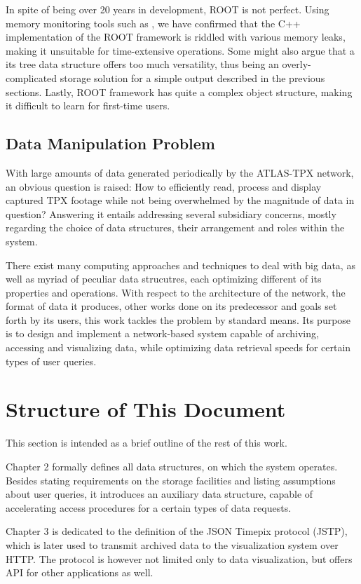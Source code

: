In spite of being over 20 years in development, ROOT is not perfect. Using memory monitoring tools such as \cite{nethercote2007valgrind}, we have confirmed that the C++ implementation of the ROOT framework is riddled with various memory leaks, making it unsuitable for time-extensive operations. Some might also argue that a its tree data structure offers too much versatility, thus being an overly-complicated storage solution for a simple output described in the previous sections. Lastly, ROOT framework has quite a complex object structure, making it difficult to learn for first-time users.

\subsection{Data Manipulation Problem}
With large amounts of data generated periodically by the ATLAS-TPX network, an obvious question is raised: How to efficiently read, process and display captured TPX footage while not being overwhelmed by the magnitude of data in question? Answering it entails addressing several subsidiary concerns, mostly regarding the choice of data structures, their arrangement and roles within the system.

There exist many computing approaches and techniques to deal with big data, as well as myriad of peculiar data strucutres, each optimizing different of its properties and operations. With respect to the architecture of the network, the format of data it produces, other works done on its predecessor and goals set forth by its users, this work tackles the problem by standard means. Its purpose is to design and implement a network-based system capable of archiving, accessing and visualizing data, while optimizing data retrieval speeds for certain types of user queries.

\section{Structure of This Document}
This section is intended as a brief outline of the rest of this work.

Chapter 2 formally defines all data structures, on which the system operates. Besides stating requirements on the storage facilities and listing assumptions about user queries, it introduces an auxiliary data structure, capable of accelerating access procedures for a certain types of data requests.

Chapter 3 is dedicated to the definition of the JSON Timepix protocol (JSTP), which is later used to transmit archived data to the visualization system over HTTP. The protocol is however not limited only to data visualization, but offers API for other applications as well.

